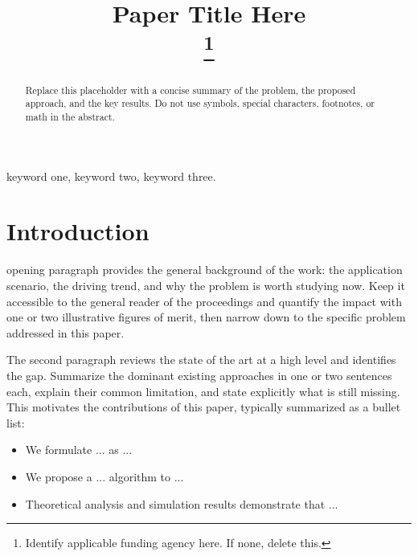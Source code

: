 \documentclass[conference]{IEEEtran}
\begin{document}
\title{Paper Title Here\\
\thanks{Identify applicable funding agency here. If none, delete this.}
}

\author{
\and
{}
}

\maketitle

\begin{abstract}

Replace this placeholder with a concise summary of the problem, the proposed approach, and the key results. Do not use symbols, special characters, footnotes, or math in the abstract.
\end{abstract}

\begin{IEEEkeywords}
keyword one, keyword two, keyword three.
\end{IEEEkeywords}

\section{Introduction}
 opening paragraph provides the general background of the work: the application scenario, the driving trend, and why the problem is worth studying now. Keep it accessible to the general reader of the proceedings and quantify the impact with one or two illustrative figures of merit, then narrow down to the specific problem addressed in this paper.

The second paragraph reviews the state of the art at a high level and identifies the gap. Summarize the dominant existing approaches in one or two sentences each, explain their common limitation, and state explicitly what is still missing. This motivates the contributions of this paper, typically summarized as a bullet list:
\begin{itemize}
\item We formulate ... as ...
\item We propose a ... algorithm to ...
\item Theoretical analysis and simulation results demonstrate that ...
\end{itemize}
\end{document}
